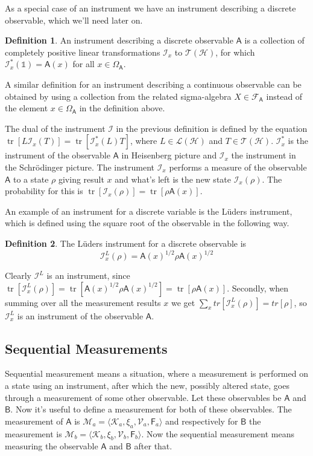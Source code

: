 \documentclass[a4paper,12pt]{wihuri}
\theoremstyle{definition}
\newtheorem{definition}{Definition}
\numberwithin{definition}{section}
\numberwithin{example}{section}
\numberwithin{theorem}{section}
\numberwithin{proposition}{section}
\numberwithin{lemma}{section}
\newcommand{\I}{\mathcal{I}}%
\newcommand{\hi}{\mathcal{H}}%
\newcommand{\ki}{\mathcal{K}}%
\newcommand{\salg}{\mathcal{F}}%
\newcommand{\tc}{\mathcal{T}}%
\newcommand{\mm}{\mathcal{M}}%
\newcommand{\V}{\mathcal{V}}%
\newcommand{\A}{\mathsf{A}}%
\newcommand{\B}{\mathsf{B}}%
\newcommand{\F}{\mathsf{F}}%
\newcommand{\id}{\mathds{1}}
\DeclareMathOperator{\tr}{tr}
\begin{document}
As a special case of an instrument we have an instrument describing a discrete observable, which we'll need later on.
\begin{definition}
An instrument describing a discrete observable $\A$ is a collection of completely positive linear transformations $\I_x$ to $\tc (\hi )$, for which $\I_x^* (\id ) = \A(x)$ for all $x \in \Omega_\A$.
\end{definition}
A similar definition for an instrument describing a continuous observable can be obtained by using a collection from the related sigma-algebra $X\in\salg_\A$ instead of the element $x\in\Omega_\A$ in the definition above. 


The dual of the instrument $\I$ in the previous definition is defined by the equation $\tr[L \I_x (T)] = \tr[\I_x^* (L)T]$, where $L \in \mathcal{L}(\hi)$ and $T \in \tc (\hi)$. $\I_x^*$ is the instrument of the observable $\A$ in Heisenberg picture and $\I_x$ the instrument in the Schrödinger picture. The instrument $\I_x$ performs a measure of the observable $\A$ to a state $\rho$ giving result $x$ and what's left is the new state $\I_x(\rho)$. The probability for this is $\tr[\I_x(\rho)] = \tr[\rho \A(x)]$.

An example of an instrument for a discrete variable is the Lüders instrument, which is defined using the square root of the observable in the following way.

\begin{definition}
The Lüders instrument for a discrete observable is 
\begin{equation}
\I_x^L(\rho) = \A(x)^{1/2}\rho \A(x)^{1/2}
\end{equation}
\end{definition}
Clearly $\I^L$ is an instrument, since $\tr[\I_x^L(\rho)] = \tr[\A(x)^{1/2}\rho \A(x)^{1/2}] = \tr[\rho \A(x)]$. Secondly, when summing over all the measurement results $x$ we get $\sum_x tr[\I_x^L(\rho)] = tr[\rho]$, so $\I_x^L$ is an instrument of the observable $\A$.
 
\subsection{Sequential Measurements}
Sequential measurement means a situation, where a measurement is performed on a state using an instrument, after which the new, possibly altered state, goes through a measurement of some other observable. Let these observables be $\A$ and $\B$. Now it's useful to define a measurement for both of these observables. The measurement of  $\A$ is $\mm_a = \langle \ki_a , \xi_a , \V_a  , \F_a \rangle$ and respectively for $\B$ the measurement is $\mm_b = \langle \ki_b , \xi_b , \V_b  , \F_b \rangle$. Now the sequential measurement means measuring the observable $\A$ and $\B$ after that. 
\end{document}
